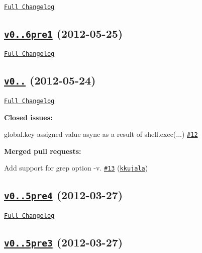 \href{https://github.com/shelljs/shelljs/compare/v0.0.6pre1...v0.0.6pre2}{\tt Full Changelog}

\subsection*{\href{https://github.com/shelljs/shelljs/tree/v0.0.6pre1}{\tt v0..\+6pre1} (2012-\/05-\/25)}

\href{https://github.com/shelljs/shelljs/compare/v0.0.5...v0.0.6pre1}{\tt Full Changelog}

\subsection*{\href{https://github.com/shelljs/shelljs/tree/v0.0.5}{\tt v0..} (2012-\/05-\/24)}

\href{https://github.com/shelljs/shelljs/compare/v0.0.5pre4...v0.0.5}{\tt Full Changelog}

{\bfseries Closed issues\+:}


\begin{DoxyItemize}
\item global.\+key assigned value \textquotesingle{}async\textquotesingle{} as a result of shell.\+exec(...) \href{https://github.com/shelljs/shelljs/issues/12}{\tt \#12}
\end{DoxyItemize}

{\bfseries Merged pull requests\+:}


\begin{DoxyItemize}
\item Add support for grep option -\/v. \href{https://github.com/shelljs/shelljs/pull/13}{\tt \#13} (\href{https://github.com/kkujala}{\tt kkujala})
\end{DoxyItemize}

\subsection*{\href{https://github.com/shelljs/shelljs/tree/v0.0.5pre4}{\tt v0..\+5pre4} (2012-\/03-\/27)}

\href{https://github.com/shelljs/shelljs/compare/v0.0.5pre3...v0.0.5pre4}{\tt Full Changelog}

\subsection*{\href{https://github.com/shelljs/shelljs/tree/v0.0.5pre3}{\tt v0..\+5pre3} (2012-\/03-\/27)}

